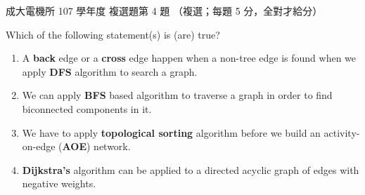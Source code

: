 \begin{pastexam}[label={px:ncku-107-ee-ds-03}]{成大電機所 107 學年度 複選題第 4 題}
（複選；每題 5 分，全對才給分）

Which of the following statement(s) is (are) true?
\begin{enumerate}[label=(\Alph*)]
\item A \textbf{back} edge or a \textbf{cross} edge happen when a non-tree edge is found when we apply
\textbf{DFS} algorithm to search a graph.
\item We can apply \textbf{BFS} based algorithm to traverse a graph in order to find biconnected
components in it.
\item We have to apply \textbf{topological sorting} algorithm before we build an activity-on-edge
(\textbf{AOE}) network.
\item \textbf{Dijkstra's} algorithm can be applied to a directed acyclic graph of edges with negative
weights.
\end{enumerate}
\end{pastexam}

